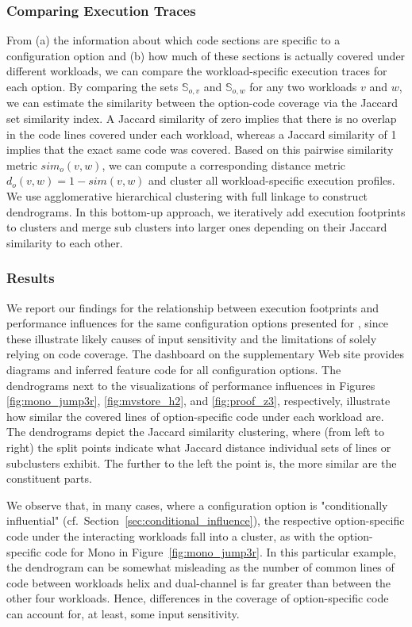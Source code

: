 {{\subsubsection{Comparing Execution Traces}
From (a) the information about which code sections are specific to a configuration option and (b) how much of these sections is actually covered under different workloads, we can compare the workload-specific execution traces for each option. By comparing the sets $\mathbb{S}_{o, v}$ and $\mathbb{S}_{o, w}$ for any two workloads $v$ and $w$, we can estimate the similarity between the option-code coverage via the Jaccard set similarity index. A Jaccard similarity of zero implies that there is no overlap in the code lines covered under each workload, whereas a Jaccard similarity of 1 implies that the exact same code was covered. Based on this pairwise similarity metric $sim_o(v, w)$, we can compute a corresponding distance metric $d_o(v, w) = 1 - sim(v, w)$ and cluster all workload-specific execution profiles. 
We use agglomerative hierarchical clustering with full linkage to construct dendrograms. In this bottom-up approach, we iteratively add execution footprints to clusters and merge sub clusters into larger ones depending on their Jaccard similarity  to each other. 

\subsubsection{Results}\label{sec:results3}
We report our findings for the relationship between execution footprints and performance influences for the same configuration options presented for , since these illustrate likely causes of input sensitivity and the limitations of solely relying on code coverage. The dashboard on the supplementary Web site provides diagrams and inferred feature code for all configuration options. The dendrograms next to the visualizations of performance influences in Figures \ref{fig:mono_jump3r}, \ref{fig:mvstore_h2}, and \ref{fig:proof_z3}, respectively, illustrate how similar the covered lines of option-specific code under each workload are. 
The dendrograms depict the Jaccard similarity clustering, where (from left to right) the split points indicate what Jaccard distance individual sets of lines or subclusters exhibit. The further to the left the point is, the more similar are the constituent parts.

We  observe that, in many cases, where  a configuration option is "conditionally influential" (cf.~Section~\ref{sec:conditional_influence}), the respective option-specific code under the interacting workloads fall into a cluster, as with the option-specific code for \textsf{Mono} in Figure~\ref{fig:mono_jump3r}. In this particular example, the dendrogram can be somewhat misleading as the number of common lines of code between workloads helix and dual-channel is far greater than between the other four workloads. Hence, differences in the coverage of option-specific code can account for, at least, some input sensitivity.

}}
